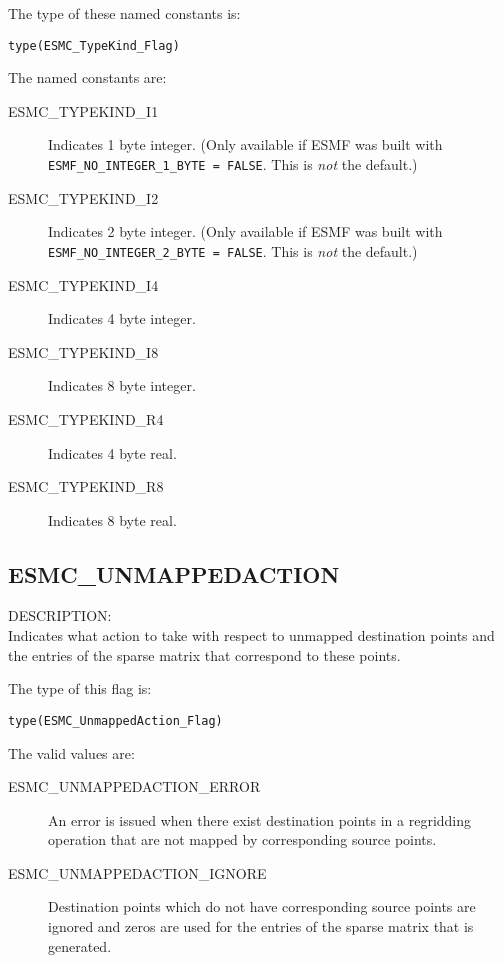 The type of these named constants is:

{\tt type(ESMC\_TypeKind\_Flag)}

The named constants are:
\begin{description}
\item [ESMC\_TYPEKIND\_I1]
      Indicates 1 byte integer. \newline 
      (Only available if ESMF was built with 
      {\tt ESMF\_NO\_INTEGER\_1\_BYTE = FALSE}. This is {\em not} the default.)
\item [ESMC\_TYPEKIND\_I2]
      Indicates 2 byte integer. \newline
      (Only available if ESMF was built with 
      {\tt ESMF\_NO\_INTEGER\_2\_BYTE = FALSE}. This is {\em not} the default.)
\item [ESMC\_TYPEKIND\_I4]
      Indicates 4 byte integer.
\item [ESMC\_TYPEKIND\_I8]
      Indicates 8 byte integer.
\item [ESMC\_TYPEKIND\_R4]
      Indicates 4 byte real.
\item [ESMC\_TYPEKIND\_R8]
      Indicates 8 byte real.
\end{description}

\subsection{ESMC\_UNMAPPEDACTION}
\label{const:unmappedaction}
{\sf DESCRIPTION:\\}
Indicates what action to take with respect to unmapped destination points
and the entries of the sparse matrix that correspond to these points.

The type of this flag is:

{\tt type(ESMC\_UnmappedAction\_Flag)}

The valid values are:
\begin{description}
	\item[ESMC\_UNMAPPEDACTION\_ERROR]
	An error is issued when there exist destination points in a regridding
	operation that are not mapped by corresponding source points.
	\item[ESMC\_UNMAPPEDACTION\_IGNORE]
	Destination points which do not have corresponding source points are 
	ignored and zeros are used for the entries of the sparse matrix
	that is generated.
\end{description}

